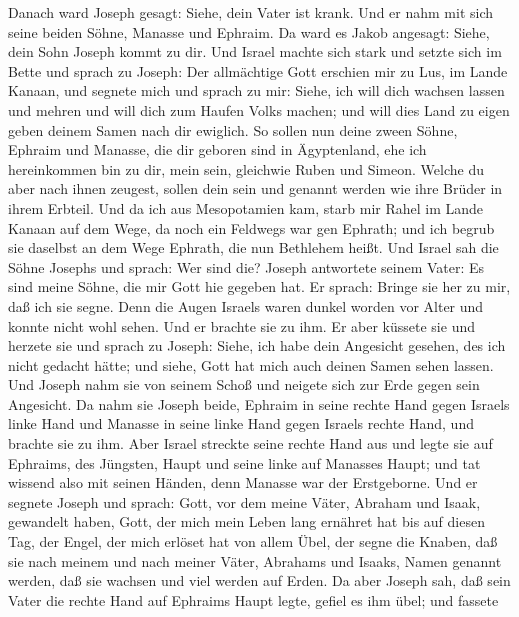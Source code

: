  Danach ward Joseph gesagt: Siehe, dein Vater ist krank. Und
er nahm mit sich seine beiden Söhne, Manasse und Ephraim. 
Da ward es Jakob angesagt: Siehe, dein Sohn Joseph kommt zu dir. Und
Israel machte sich stark und setzte sich im Bette  und
sprach zu Joseph: Der allmächtige Gott erschien mir zu Lus, im Lande
Kanaan, und segnete mich  und sprach zu mir: Siehe, ich will
dich wachsen lassen und mehren und will dich zum Haufen Volks machen;
und will dies Land zu eigen geben deinem Samen nach dir ewiglich.
 So sollen nun deine zween Söhne, Ephraim und Manasse, die
dir geboren sind in Ägyptenland, ehe ich hereinkommen bin zu dir, mein
sein, gleichwie Ruben und Simeon.  Welche du aber nach ihnen
zeugest, sollen dein sein und genannt werden wie ihre Brüder in ihrem
Erbteil.  Und da ich aus Mesopotamien kam, starb mir Rahel
im Lande Kanaan auf dem Wege, da noch ein Feldwegs war gen Ephrath; und
ich begrub sie daselbst an dem Wege Ephrath, die nun Bethlehem heißt.
 Und Israel sah die Söhne Josephs und sprach: Wer sind die?
 Joseph antwortete seinem Vater: Es sind meine Söhne, die
mir Gott hie gegeben hat. Er sprach: Bringe sie her zu mir, daß ich sie
segne.  Denn die Augen Israels waren dunkel worden vor
Alter und konnte nicht wohl sehen. Und er brachte sie zu ihm. Er aber
küssete sie und herzete sie  und sprach zu Joseph: Siehe,
ich habe dein Angesicht gesehen, des ich nicht gedacht hätte; und siehe,
Gott hat mich auch deinen Samen sehen lassen.  Und Joseph
nahm sie von seinem Schoß und neigete sich zur Erde gegen sein
Angesicht.  Da nahm sie Joseph beide, Ephraim in seine
rechte Hand gegen Israels linke Hand und Manasse in seine linke Hand
gegen Israels rechte Hand, und brachte sie zu ihm.  Aber
Israel streckte seine rechte Hand aus und legte sie auf Ephraims, des
Jüngsten, Haupt und seine linke auf Manasses Haupt; und tat wissend also
mit seinen Händen, denn Manasse war der Erstgeborne.  Und
er segnete Joseph und sprach: Gott, vor dem meine Väter, Abraham und
Isaak, gewandelt haben, Gott, der mich mein Leben lang ernähret hat bis
auf diesen Tag,  der Engel, der mich erlöset hat von allem
Übel, der segne die Knaben, daß sie nach meinem und nach meiner Väter,
Abrahams und Isaaks, Namen genannt werden, daß sie wachsen und viel
werden auf Erden.  Da aber Joseph sah, daß sein Vater die
rechte Hand auf Ephraims Haupt legte, gefiel es ihm übel; und fassete
